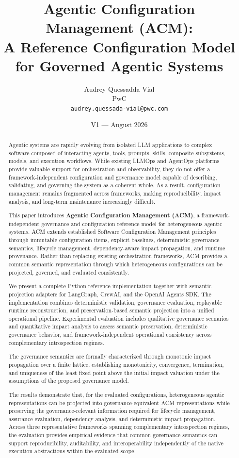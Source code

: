\documentclass[10pt]{article}
\title{\textbf{Agentic Configuration Management (ACM):\\A Reference Configuration Model for Governed Agentic Systems}}
\author{
  Audrey Quessadda-Vial\\
  PwC\\
  \texttt{audrey.quessada-vial@pwc.com}
}
\date{V1 --- August 2026}
\begin{document}
\maketitle

\begin{abstract}

Agentic systems are rapidly evolving from isolated LLM applications to complex software composed of interacting agents, tools, prompts, skills, composite subsystems, models, and execution workflows. While existing LLMOps and AgentOps platforms provide valuable support for orchestration and observability, they do not offer a framework-independent configuration and governance model capable of describing, validating, and governing the system as a coherent whole. As a result, configuration management remains fragmented across frameworks, making reproducibility, impact analysis, and long-term maintenance increasingly difficult.

This paper introduces \textbf{Agentic Configuration Management (ACM)}, a framework-independent governance and configuration reference model for heterogeneous agentic systems. ACM extends established Software Configuration Management principles through immutable configuration items, explicit baselines, deterministic governance semantics, lifecycle management, dependency-aware impact propagation, and runtime provenance. Rather than replacing existing orchestration frameworks, ACM provides a common semantic representation through which heterogeneous configurations can be projected, governed, and evaluated consistently.

We present a complete Python reference implementation together with semantic projection adapters for LangGraph, CrewAI, and the OpenAI Agents SDK. The implementation combines deterministic validation, governance evaluation, replayable runtime reconstruction, and preservation-based semantic projection into a unified operational pipeline. Experimental evaluation includes qualitative governance scenarios and quantitative impact analysis to assess semantic preservation, deterministic governance behavior, and framework-independent operational consistency across complementary introspection regimes.

The governance semantics are formally characterized through monotonic impact propagation over a finite lattice, establishing monotonicity, convergence, termination, and uniqueness of the least fixed point above the initial impact valuation under the assumptions of the proposed governance model.

The results demonstrate that, for the evaluated configurations, heterogeneous agentic representations can be projected into governance-equivalent ACM representations while preserving the governance-relevant information required for lifecycle management, assurance evaluation, dependency analysis, and deterministic impact propagation. Across three representative frameworks spanning complementary introspection regimes, the evaluation provides empirical evidence that common governance semantics can support reproducibility, auditability, and interoperability independently of the native execution abstractions within the evaluated scope.

\end{abstract}
\end{document}
